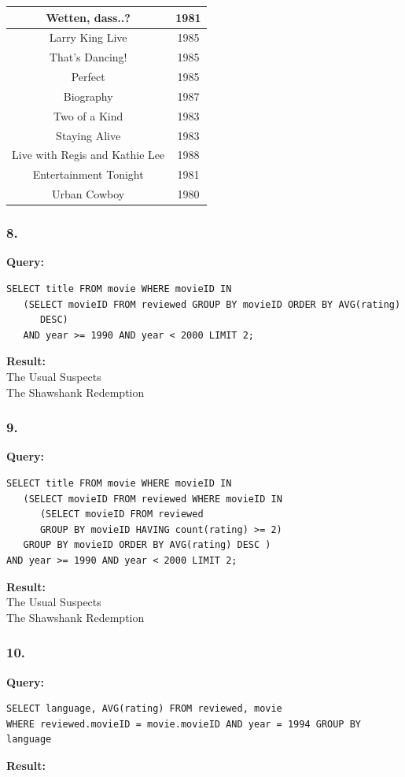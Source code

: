 \documentclass[10pt,a4paper,final]{report}
\begin{document}
\begin{tabular}{|c|c|}
\hline Wetten, dass..? & 1981 \\ 
\hline Larry King Live & 1985 \\ 
\hline That's Dancing! & 1985 \\ 
\hline Perfect & 1985 \\ 
\hline Biography & 1987 \\ 
\hline Two of a Kind & 1983 \\ 
\hline Staying Alive & 1983 \\ 
\hline Live with Regis and Kathie Lee & 1988 \\ 
\hline Entertainment Tonight & 1981 \\ 
\hline Urban Cowboy & 1980 \\ 
\hline 
\end{tabular}

\subsubsection*{8.}
\textbf{Query:}
\begin{lstlisting}
SELECT title FROM movie WHERE movieID IN 
   (SELECT movieID FROM reviewed GROUP BY movieID ORDER BY AVG(rating) 
      DESC) 
   AND year >= 1990 AND year < 2000 LIMIT 2;
\end{lstlisting}
\textbf{Result:}\\
The Usual Suspects\\
The Shawshank Redemption
\subsubsection*{9.}
\textbf{Query:}
\begin{lstlisting}
SELECT title FROM movie WHERE movieID IN 
   (SELECT movieID FROM reviewed WHERE movieID IN 
      (SELECT movieID FROM reviewed 
      GROUP BY movieID HAVING count(rating) >= 2) 
   GROUP BY movieID ORDER BY AVG(rating) DESC )  
AND year >= 1990 AND year < 2000 LIMIT 2;
\end{lstlisting}
\textbf{Result:}\\
The Usual Suspects\\
The Shawshank Redemption

\subsubsection*{10.}
\textbf{Query:}
\begin{lstlisting}
SELECT language, AVG(rating) FROM reviewed, movie 
WHERE reviewed.movieID = movie.movieID AND year = 1994 GROUP BY language
\end{lstlisting}
\textbf{Result:}
\end{document}
